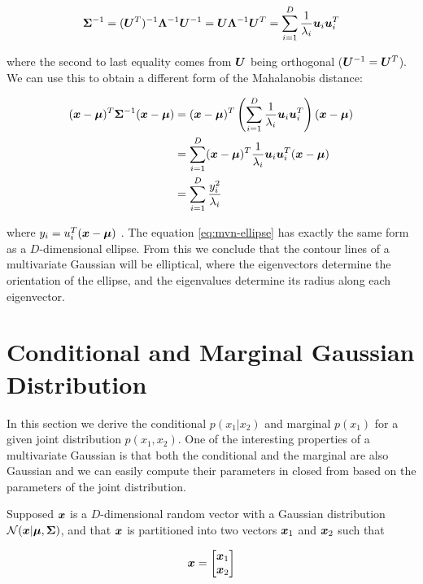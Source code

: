 \begin{equation}
{\bm{\Sigma}}^{-1} = ({\bm{U}}^T)^{-1} {\bm{\Lambda}}^{-1} {\bm{U}}^{-1} = {\bm{U}} {\bm{\Lambda}}^{-1} {\bm{U}}^T = \sum_{i = 1}^D \frac{1}{\lambda_i} {\bm{u}}_i {\bm{u}}_i^T
\end{equation}

where the second to last equality comes from ${\bm{U}}$ being orthogonal (${\bm{U}}^{-1} = {\bm{U}}^T$). We can use this to obtain a different form of the Mahalanobis distance: 

\begin{align}
({\bm{x}} - {\bm{\mu}})^T {\bm{\Sigma}}^{-1} ({\bm{x}} - {\bm{\mu}}) &= ({\bm{x}} - {\bm{\mu}})^T \left( \sum_{i = 1}^D \frac{1}{\lambda_i} {\bm{u}}_i {\bm{u}}_i^T \right) ({\bm{x}} - {\bm{\mu}}) \\
&= \sum_{i = 1}^D ({\bm{x}} - {\bm{\mu}})^T \frac{1}{\lambda_i} {\bm{u}}_i {\bm{u}}_i^T ({\bm{x}} - {\bm{\mu}}) \\
&= \sum_{i = 1}^D \frac{y_i^2}{\lambda_i} \label{eq:mvn-ellipse}
\end{align}

where $y_i = u_{i}^{T} ({\bm{x}} - {\bm{\mu}})$ . The equation \eqref{eq:mvn-ellipse} has exactly the same form as a $D$-dimensional ellipse. From this we conclude that the contour lines of a multivariate Gaussian will be elliptical, where the eigenvectors determine the orientation of the ellipse, and the eigenvalues determine its radius  along each eigenvector.


\section{Conditional and Marginal Gaussian Distribution}

In this section we derive the conditional $p(x_1 | x_2)$ and marginal $p(x_1)$ for a given joint distribution $p(x_1, x_2)$. One of the interesting properties of a multivariate Gaussian is that both the conditional and the marginal are also Gaussian and we can easily compute their parameters in closed from based on the parameters of the joint distribution.

Supposed ${\bm{x}}$ is a $D$-dimensional random vector with a Gaussian distribution ${\mathcal{N}}({\bm{x}} | {\bm{\mu}}, {\bm{\Sigma}})$, and that ${\bm{x}}$ is partitioned into two vectors ${\bm{x}}_1$ and ${\bm{x}}_2$ such that

\begin{equation}
{\bm{x}} = {\begin{bmatrix} {\bm{x}}_1 \\ {\bm{x}}_2 \end{bmatrix}}
\end{equation}

